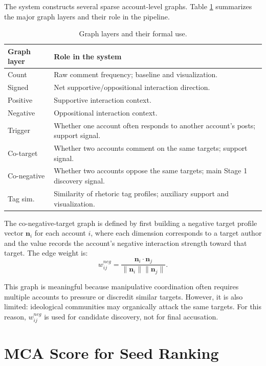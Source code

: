 \documentclass[conference]{IEEEtran}
\begin{document}
The system constructs several sparse account-level graphs. Table
\ref{tab:graphs} summarizes the major graph layers and their role in the
pipeline.

\begin{table}[htbp]
\centering
\caption{Graph layers and their formal use.}
\label{tab:graphs}
\scriptsize
\setlength{\tabcolsep}{3pt}
\begin{tabularx}{\columnwidth}{p{}X}
\toprule
Graph layer & Role in the system \\
\midrule
Count & Raw comment frequency; baseline and visualization. \\
Signed & Net supportive/oppositional interaction direction. \\
Positive & Supportive interaction context. \\
Negative & Oppositional interaction context. \\
Trigger & Whether one account often responds to another account's posts; support signal. \\
Co-target & Whether two accounts comment on the same targets; support signal. \\
Co-negative & Whether two accounts oppose the same targets; main Stage 1 discovery signal. \\
Tag sim. & Similarity of rhetoric tag profiles; auxiliary support and visualization. \\
\bottomrule
\end{tabularx}
\end{table}

The co-negative-target graph is defined by first building a negative target
profile vector $\mathbf{n}_i$ for each account $i$, where each dimension
corresponds to a target author and the value records the account's negative
interaction strength toward that target. The edge weight is:
\begin{equation}
w_{ij}^{neg} =
\frac{\mathbf{n}_i \cdot \mathbf{n}_j}
{\|\mathbf{n}_i\|\|\mathbf{n}_j\|}.
\end{equation}

This graph is meaningful because manipulative coordination often requires
multiple accounts to pressure or discredit similar targets. However, it is
also limited: ideological communities may organically attack the same targets.
For this reason, $w_{ij}^{neg}$ is used for candidate discovery, not for final
accusation.

\section{MCA Score for Seed Ranking}
\end{document}
